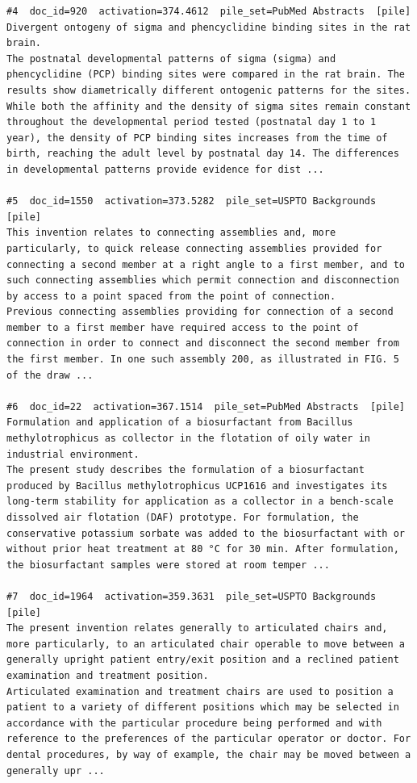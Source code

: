 \begin{verbatim}
#4  doc_id=920  activation=374.4612  pile_set=PubMed Abstracts  [pile]
Divergent ontogeny of sigma and phencyclidine binding sites in the rat brain.
The postnatal developmental patterns of sigma (sigma) and phencyclidine (PCP) binding sites were compared in the rat brain. The results show diametrically different ontogenic patterns for the sites. While both the affinity and the density of sigma sites remain constant throughout the developmental period tested (postnatal day 1 to 1 year), the density of PCP binding sites increases from the time of birth, reaching the adult level by postnatal day 14. The differences in developmental patterns provide evidence for dist ...

#5  doc_id=1550  activation=373.5282  pile_set=USPTO Backgrounds  [pile]
This invention relates to connecting assemblies and, more particularly, to quick release connecting assemblies provided for connecting a second member at a right angle to a first member, and to such connecting assemblies which permit connection and disconnection by access to a point spaced from the point of connection.
Previous connecting assemblies providing for connection of a second member to a first member have required access to the point of connection in order to connect and disconnect the second member from the first member. In one such assembly 200, as illustrated in FIG. 5 of the draw ...

#6  doc_id=22  activation=367.1514  pile_set=PubMed Abstracts  [pile]
Formulation and application of a biosurfactant from Bacillus methylotrophicus as collector in the flotation of oily water in industrial environment.
The present study describes the formulation of a biosurfactant produced by Bacillus methylotrophicus UCP1616 and investigates its long-term stability for application as a collector in a bench-scale dissolved air flotation (DAF) prototype. For formulation, the conservative potassium sorbate was added to the biosurfactant with or without prior heat treatment at 80 °C for 30 min. After formulation, the biosurfactant samples were stored at room temper ...

#7  doc_id=1964  activation=359.3631  pile_set=USPTO Backgrounds  [pile]
The present invention relates generally to articulated chairs and, more particularly, to an articulated chair operable to move between a generally upright patient entry/exit position and a reclined patient examination and treatment position.
Articulated examination and treatment chairs are used to position a patient to a variety of different positions which may be selected in accordance with the particular procedure being performed and with reference to the preferences of the particular operator or doctor. For dental procedures, by way of example, the chair may be moved between a generally upr ...


\end{verbatim}

